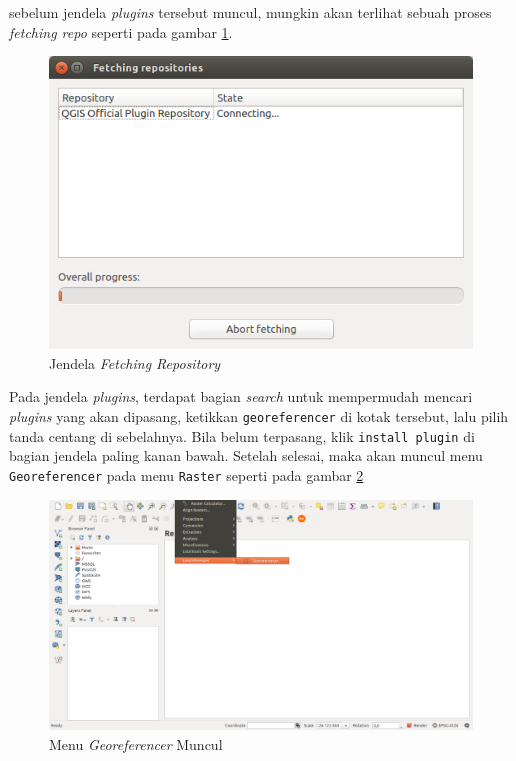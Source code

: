 \begin{enumerate}[1.]
  sebelum jendela \textit{plugins} tersebut muncul, mungkin akan terlihat sebuah proses \textit{fetching repo} seperti pada gambar \ref{fig:fetchingrepo}.
  
  \begin{figure}[H]
    \centering
    \includegraphics[width=1\textwidth]{./resources/019-fetching-repo}
    \caption{Jendela \textit{Fetching Repository}}
    \label{fig:fetchingrepo}
  \end{figure}
  
  Pada jendela \textit{plugins}, terdapat bagian \textit{search} untuk mempermudah mencari \textit{plugins} yang akan dipasang, ketikkan \verb|georeferencer| di kotak tersebut, lalu pilih tanda centang di sebelahnya. Bila belum terpasang, klik \verb|install plugin| di bagian jendela paling kanan bawah. Setelah selesai, maka akan muncul menu \verb|Georeferencer| pada menu \verb|Raster| seperti pada gambar \ref{fig:georefmenuexists}
  
  \begin{figure}[H]
    \centering
    \includegraphics[width=1\textwidth]{./resources/021-georef-menu-exists}
    \caption{Menu \textit{Georeferencer} Muncul}
    \label{fig:georefmenuexists}
  \end{figure}
  

\end{enumerate}
